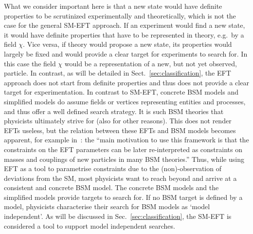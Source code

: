 What we consider important here is that a new state would have
definite properties to be scrutinized experimentally and theoretically, which is not the case for the 
general SM-EFT approach.
If an experiment would find a new state, it would have definite properties that have to be represented in theory, e.g.\ by a field $\chi $.
Vice versa, if theory would propose a new state, its properties would largely be fixed and
would provide a clear target for experiments to search for.
In this case the field $\chi $ would be a representation of a new, but
not yet observed, particle.
In contrast, as will be detailed in Sect.~\ref{sec:classification}, the EFT approach
does not start from definite properties and thus does not provide
a clear target for experimentation.  
In contrast to SM-EFT, concrete BSM models and simplified models
do assume fields or vertices representing entities and processes, and thus offer a well defined search strategy. 
It is such BSM theories that physicists ultimately strive for (also for other reasons).
This does not render EFTs useless, but the relation between these EFTs and BSM models becomes
apparent, for example in~\cite[p.~305]{deFlorian:2016spz}: the
``main motivation to use this framework is that the constraints on the EFT parameters can be {}
later re-interpreted as constraints on masses and couplings of new particles in many BSM theories.''
Thus, while using EFT as a tool to parametrise constraints due to the (non)-observation of deviations
from the SM, most physicists want to reach beyond and arrive at a consistent and concrete BSM model.
The concrete BSM models and the simplified models provide targets to search for. 
If no BSM target is defined by a model, physicists characterise their search for BSM models as `model independent'.
As will be discussed in Sec.~\ref{sec:classification}, the SM-EFT is considered a tool to support model independent searches. 
